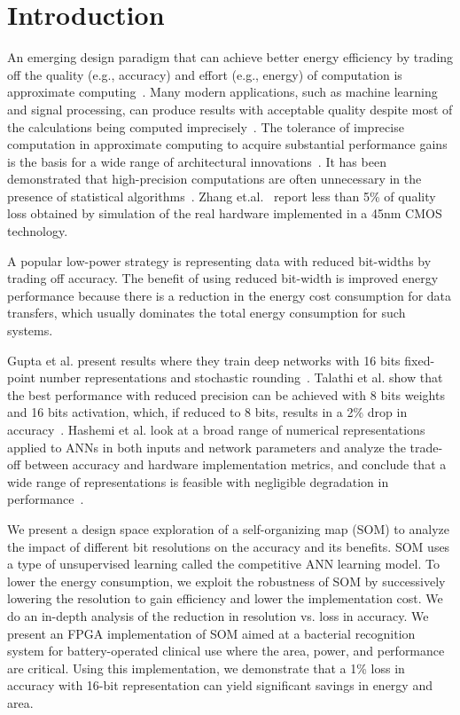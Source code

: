 \section{Introduction}
An emerging design paradigm that can achieve better energy efficiency by trading off the quality (e.g., accuracy) and effort (e.g., energy) of computation is approximate computing~\cite{Zhang2014}. Many modern applications, such as machine learning and signal processing, can produce results with acceptable quality despite most of the calculations being computed imprecisely~\cite{Ye2013}. The tolerance of imprecise computation in approximate computing to acquire substantial performance gains is the basis for a wide range of architectural innovations~\cite{Esmaeilzadeh2012}. It has been demonstrated that high-precision computations are often unnecessary in the presence of statistical algorithms~\cite{Moons2017,Zhang2015}. Zhang et.al.~\cite{Zhang2015} report less than 5\% of quality loss obtained by simulation of the real hardware implemented in a 45nm CMOS technology.

A popular low-power strategy is representing data with reduced bit-widths by trading off accuracy. The benefit of using reduced bit-width is improved energy performance because there is a reduction in the energy cost consumption for data transfers, which usually dominates the total energy consumption for such systems.

Gupta et al. present results where they train deep networks with 16 bits fixed-point number representations and stochastic rounding~\cite{Gupta2015}. Talathi et al. show that the best performance with reduced precision can be achieved with 8 bits weights and 16 bits activation, which, if reduced to 8 bits, results in a 2\% drop in accuracy~\cite{lin2016overcoming}. Hashemi et al. look at a broad range of numerical representations applied to ANNs in both inputs and network parameters and analyze the trade-off between accuracy and hardware implementation metrics, and conclude that a wide range of representations is feasible with negligible degradation in performance~\cite{Hashemi2017}.

We present a design space exploration of a self-organizing map (SOM) to analyze the impact of different bit resolutions on the accuracy and its benefits. SOM uses a type of unsupervised learning called the competitive ANN learning model. To lower the energy consumption, we exploit the robustness of SOM by successively lowering the resolution to gain efficiency and lower the implementation cost. We do an in-depth analysis of the reduction in resolution vs. loss in accuracy. We present an FPGA implementation of SOM aimed at a bacterial recognition system for battery-operated clinical use where the area, power, and performance are critical. Using this implementation, we demonstrate that a 1\% loss in accuracy with 16-bit representation can yield significant savings in energy and area.
